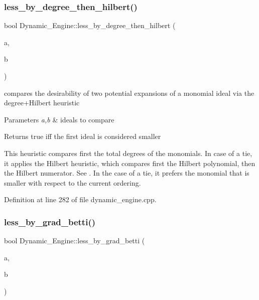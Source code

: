 \subsubsection{\texorpdfstring{less\+\_\+by\+\_\+degree\+\_\+then\+\_\+hilbert()}{less\_by\_degree\_then\_hilbert()}}
{\footnotesize\ttfamily bool Dynamic\+\_\+\+Engine\+::less\+\_\+by\+\_\+degree\+\_\+then\+\_\+hilbert (\begin{DoxyParamCaption}\item[{\hyperlink{group___g_b_computation_class_dynamic___engine_1_1_p_p___with___ideal}{P\+P\+\_\+\+With\+\_\+\+Ideal} \&}]{a,  }\item[{\hyperlink{group___g_b_computation_class_dynamic___engine_1_1_p_p___with___ideal}{P\+P\+\_\+\+With\+\_\+\+Ideal} \&}]{b }\end{DoxyParamCaption})}



compares the desirability of two potential expansions of a monomial ideal via the degree+\+Hilbert heuristic 


\begin{DoxyParams}{Parameters}
{\em a,b} & ideals to compare \\
\hline
\end{DoxyParams}
\begin{DoxyReturn}{Returns}
{\ttfamily true} iff the first ideal is considered smaller
\end{DoxyReturn}
This heuristic compares first the total degrees of the monomials. In case of a tie, it applies the Hilbert heuristic, which compares first the Hilbert polynomial, then the Hilbert numerator. See \cite{CaboaraDynAlg}. In the case of a tie, it prefers the monomial that is smaller with respect to the current ordering. 

Definition at line 282 of file dynamic\+\_\+engine.\+cpp.

\mbox{\label{namespace_dynamic___engine_a8c67515d04de029583ba590b2ca4d6e4}} 
\subsubsection{\texorpdfstring{less\+\_\+by\+\_\+grad\+\_\+betti()}{less\_by\_grad\_betti()}}
{\footnotesize\ttfamily bool Dynamic\+\_\+\+Engine\+::less\+\_\+by\+\_\+grad\+\_\+betti (\begin{DoxyParamCaption}\item[{\hyperlink{group___g_b_computation_class_dynamic___engine_1_1_p_p___with___ideal}{P\+P\+\_\+\+With\+\_\+\+Ideal} \&}]{a,  }\item[{\hyperlink{group___g_b_computation_class_dynamic___engine_1_1_p_p___with___ideal}{P\+P\+\_\+\+With\+\_\+\+Ideal} \&}]{b }\end{DoxyParamCaption})}



